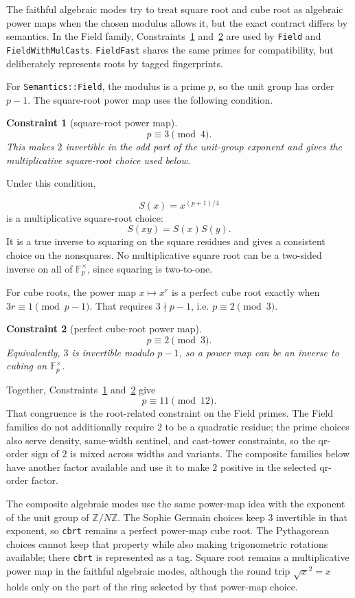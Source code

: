 \documentclass[11pt]{article}
\newcommand{\Z}{\mathbb{Z}}
\newcommand{\F}{\mathbb{F}}
\newcommand{\FieldFast}{\texttt{FieldFast}}
\newcommand{\FieldMC}{\texttt{FieldWith\allowbreak{}Mul\allowbreak{}Casts}}
\theoremstyle{plain}
\newtheorem{constraint}{Constraint}
\begin{document}
The faithful algebraic modes try to treat square root and cube root as algebraic
power maps when the chosen modulus allows it, but the exact contract differs by
semantics.  In the Field family, Constraints~\ref{con:sqrt}
and~\ref{con:cbrt} are used by \texttt{Field} and \FieldMC{}.  \FieldFast{}
shares the same primes for compatibility, but deliberately represents roots by
tagged fingerprints.

For \texttt{Semantics::Field}, the modulus is a prime \(p\), so the unit group
has order \(p-1\).  The square-root power map uses the following condition.

\begin{constraint}[square-root power map]
\label{con:sqrt}
\[
  p\equiv 3\pmod 4.
\]
This makes \(2\) invertible in the odd part of the unit-group exponent and gives
the multiplicative square-root choice used below.
\end{constraint}

Under this condition,

\[
  S(x)=x^{(p+1)/4}
\]
is a multiplicative square-root choice:
\[
  S(xy)=S(x)S(y).
\]
It is a true inverse to squaring on the square residues and gives a consistent
choice on the nonsquares.  No multiplicative square root can be a two-sided
inverse on all of \(\F_p^\times\), since squaring is two-to-one.

For cube roots, the power map \(x\mapsto x^r\) is a perfect cube root exactly
when \(3r\equiv 1\pmod {p-1}\).  That requires \(3\nmid p-1\), i.e.
\(p\equiv 2\pmod 3\).

\begin{constraint}[perfect cube-root power map]
\label{con:cbrt}
\[
  p\equiv 2\pmod 3.
\]
Equivalently, \(3\) is invertible modulo \(p-1\), so a power map can be an
inverse to cubing on \(\F_p^\times\).
\end{constraint}

Together, Constraints~\ref{con:sqrt} and~\ref{con:cbrt} give
\[
  p\equiv 11\pmod {12}.
\]
That congruence is the root-related constraint on the Field primes.  The Field
families do not additionally require \(2\) to be a quadratic residue; the prime
choices also serve density, same-width sentinel, and cast-tower constraints, so
the qr-order sign of \(2\) is mixed across widths and variants.  The composite
families below have another factor available and use it to make \(2\) positive
in the selected qr-order factor.

The composite algebraic modes use the same power-map idea with the exponent of
the unit group of \(\Z/N\Z\).  The Sophie Germain choices keep \(3\) invertible
in that exponent, so \texttt{cbrt} remains a perfect power-map cube root.  The
Pythagorean choices cannot keep that property while also making trigonometric
rotations available; there \texttt{cbrt} is represented as a tag.
Square root remains a multiplicative power map in the faithful algebraic modes,
although the round trip \(\sqrt{x}^2=x\) holds only on the part of the ring
selected by that power-map choice.
\end{document}
